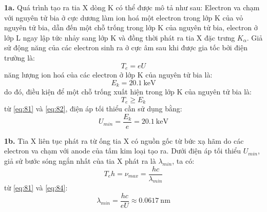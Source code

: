 \noindent\textbf{1a.} Quá trình tạo ra tia X dòng K có thể được mô tả như sau: Electron va chạm với nguyên tử bia ở cực dương làm ion hoá một electron trong lớp K của vỏ nguyên tử bia, dẫn đến một chỗ trống trong lớp K của nguyên tử bia, electron ở lớp L ngay lập tức nhảy sang lớp K và đồng thời phát ra tia X đặc trưng $K_{\alpha}$. Giả sử động năng của các electron sinh ra ở cực âm sau khi được gia tốc bởi điện trường là:
\begin{equation}
  \label{eq:81}
  T_{e}=eU
\end{equation}
năng lượng ion hoá của các electron ở lớp K của nguyên tử bia là:
\begin{equation*}
  E_{k}=\SI{20,1}{\kilo\electronvolt}
\end{equation*}
do đó, điều kiện để một chỗ trống xuất hiện trong lớp K của nguyên tử bia là:
\begin{equation}
  \label{eq:82}
  T_{e}\geqslant E_{k}
\end{equation}
từ \eqref{eq:81} và \eqref{eq:82}, điện áp tối thiểu cần sử dụng bằng:
\begin{equation}
  \label{eq:83}
  U_{min}=\frac{E_{k}}{e}=\SI{20,1}{\kilo\electronvolt}
\end{equation}

\noindent\textbf{1b.} Tia X liên tục phát ra từ ống tia X có nguồn gốc từ bức xạ hãm do các electron va chạm với anode của tấm kim loại tạo ra. Dưới điện áp tối thiểu $U_{min}$, giả sử bước sóng ngắn nhất của tia X phát ra là $\lambda_{min}$, ta có:
\begin{equation}
  \label{eq:84}
  T_{e}h=\nu_{max}=\frac{hc}{\lambda_{min}}
\end{equation}
từ \eqref{eq:81} và \eqref{eq:84}:
\begin{equation}
  \label{eq:85}
  \lambda_{min}=\frac{hc}{eU}\approx\SI{0,0617}{\nano\metre}
\end{equation}

